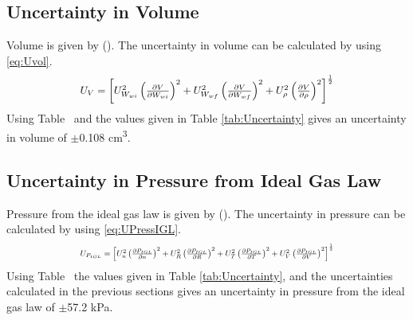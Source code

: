 \documentclass[10pt,journal,letterpaper]{IEEEtran}
\begin{document}
\subsection*{Uncertainty in Volume}

Volume is given by (\todo).
The uncertainty in volume can be calculated by using \eqref{eq:Uvol}.
\begin{equation}
\label{eq:Uvol}
\resizebox{227pt}{!}{$U_{V}=\left[U_{W_{wi}}^2 \left(\frac{\partial V}{\partial W_{wi}}\right)^2 + U_{W_{wf}}^2 \left(\frac{\partial V}{\partial W_{wf}}\right)^2 + U_{\rho}^2 \left(\frac{\partial V}{\partial \rho}\right)^2 \right]^{\frac{1}{2}}$}
\end{equation}
Using Table \todo\ and the values given in Table \ref{tab:Uncertainty} gives an uncertainty in volume of $\pm$0.108 \unit{\centi\meter\cubed}.

\subsection*{Uncertainty in Pressure from Ideal Gas Law}

Pressure from the ideal gas law is given by (\todo).
The uncertainty in pressure can be calculated by using \eqref{eq:UPressIGL}.
\begin{equation}
\label{eq:UPressIGL}
\resizebox{227pt}{!}{$U_{P_{IGL}}=\left[U_{n}^2 \left(\frac{\partial P_{IGL}}{\partial n}\right)^2 + U_{R}^2 \left(\frac{\partial P_{IGL}}{\partial R}\right)^2 + U_{T}^2 \left(\frac{\partial P_{IGL}}{\partial T}\right)^2 + U_{V}^2 \left(\frac{\partial P_{IGL}}{\partial V}\right)^2 \right]^{\frac{1}{2}}$}
\end{equation}
Using Table \todo\, the values given in Table \ref{tab:Uncertainty}, and the uncertainties calculated in the previous sections gives an uncertainty in pressure from the ideal gas law of $\pm$57.2 kPa.

\end{document}
